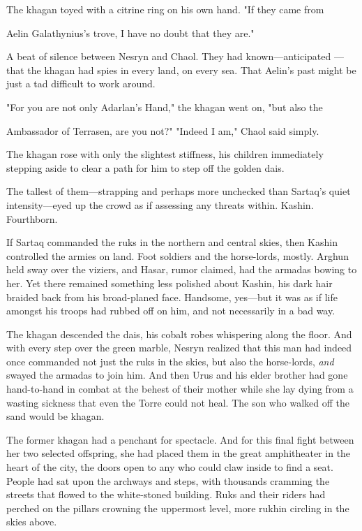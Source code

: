 The khagan toyed with a citrine ring on his own hand. "If they came from

Aelin Galathynius's trove, I have no doubt that they are."

A beat of silence between Nesryn and Chaol. They had known---anticipated ---that the khagan had spies in every land, on every sea. That Aelin's past might be just a tad difficult to work around.

"For you are not only Adarlan's Hand," the khagan went on, "but also the

Ambassador of Terrasen, are you not?" "Indeed I am," Chaol said simply.

The khagan rose with only the slightest stiffness, his children immediately stepping aside to clear a path for him to step off the golden dais.

The tallest of them---strapping and perhaps more unchecked than Sartaq's quiet intensity---eyed up the crowd as if assessing any threats within. Kashin. Fourthborn.

If Sartaq commanded the ruks in the northern and central skies, then Kashin controlled the armies on land. Foot soldiers and the horse-lords, mostly. Arghun held sway over the viziers, and Hasar, rumor claimed, had the armadas bowing to her. Yet there remained something less polished about Kashin, his dark hair braided back from his broad-planed face. Handsome, yes---but it was as if life amongst his troops had rubbed off on him, and not necessarily in a bad way.

The khagan descended the dais, his cobalt robes whispering along the floor. And with every step over the green marble, Nesryn realized that this man had indeed once commanded not just the ruks in the skies, but also the horse-lords, \emph{and} swayed the armadas to join him. And then Urus and his elder brother had gone hand-to-hand in combat at the behest of their mother while she lay dying from a wasting sickness that even the Torre could not heal. The son who walked off the sand would be khagan.

The former khagan had a penchant for spectacle. And for this final fight between her two selected offspring, she had placed them in the great amphitheater in the heart of the city, the doors open to any who could claw inside to find a seat. People had sat upon the archways and steps, with thousands cramming the streets that flowed to the white-stoned building. Ruks and their riders had perched on the pillars crowning the uppermost level, more rukhin circling in the skies above.

